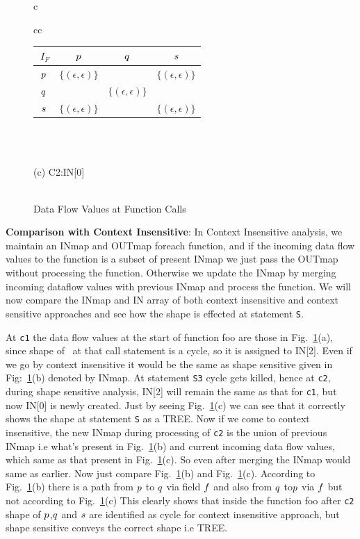 \begin{figure}[h]
\begin{tabular}{c}
{\begin{tabular}{cc}
\renewcommand{\arraystretch}{1.2}
\begin{tabular}[b]{|c|c|c|c|}
\hline 
$\ I_F$     & $p$	               & $q$
&  $s$              \\ \hline \hline 
$p$ & $\{ (\epsilon, \epsilon)\}$    &   & $\{ (\epsilon, \epsilon)\}$ \\ \hline
$q$ &     & $\{ (\epsilon, \epsilon)\}$   &  \\ \hline
$s$ & $\{ (\epsilon, \epsilon)\}$    &    & $\{ (\epsilon, \epsilon)\}$ \\ \hline
\end{tabular} \\
\end{tabular}
} \\

\scriptsize (c) C2:IN[0] \\ \\

\end{tabular}

\caption{Data Flow Values at Function Calls} \label{fig:Inmap}
\end{figure}

\par 
\textbf{Comparison with Context Insensitive}: In Context Insensitive analysis,  we maintain an INmap and OUTmap foreach function, and 
if the incoming data flow values to the function is a subset of present INmap we just pass the OUTmap without processing the function. Otherwise 
we update the INmap by merging incoming dataflow values with  previous INmap and process the function. We will now compare the INmap and IN array  
of both context insensitive and context sensitive approaches and see how the shape is effected at statement {\tt S}.

At {\tt c1} the data flow values at the start of function foo are those in Fig.~\ref{fig:Inmap}(a), since shape of \p\ at that call statement 
is a cycle, so it is assigned to IN[2]. Even if we go by context insensitive it would be the same as shape sensitive given 
in Fig:~\ref{fig:Inmap}(b) denoted by INmap. At statement {\tt S3} cycle gets killed, hence at {\tt c2}, during shape sensitive 
analysis, IN[2] will remain the same as that for {\tt c1}, but now IN[0] is newly created. Just by seeing Fig.~\ref{fig:Inmap}(c) we can see that 
it correctly shows the shape at statement {\tt S} as a TREE. Now if we come to context insensitive, the new INmap during processing of {\tt c2} 
is the union of previous INmap i.e what's present in Fig.~\ref{fig:Inmap}(b) and current incoming data flow values, which same as that present 
in Fig.~\ref{fig:Inmap}(c). So even after merging the INmap would same as earlier. Now just compare Fig.~\ref{fig:Inmap}(b)
and Fig.~\ref{fig:Inmap}(c). According to Fig.~\ref{fig:Inmap}(b) there is a path from $p$ to $q$ via field $f$ and also from $q$ to$ p$ via $f$ but not according to Fig.~\ref{fig:Inmap}(c)
This clearly shows that inside the function foo after {\tt c2} shape of $p$,$q$ and $s$ are identified as cycle for context insensitive 
approach, but shape sensitive conveys the correct shape i.e TREE.

